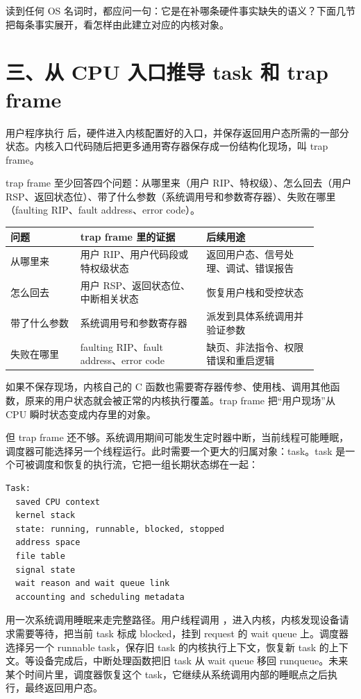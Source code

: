 读到任何 OS 名词时，都应问一句：它是在补哪条硬件事实缺失的语义？下面几节把每条事实展开，看怎样由此建立对应的内核对象。

\section{三、从 CPU 入口推导 task 和 trap frame}

用户程序执行  后，硬件进入内核配置好的入口，并保存返回用户态所需的一部分状态。内核入口代码随后把更多通用寄存器保存成一份结构化现场，叫 trap frame。

trap frame 至少回答四个问题：从哪里来（用户 RIP、特权级）、怎么回去（用户 RSP、返回状态位）、带了什么参数（系统调用号和参数寄存器）、失败在哪里（faulting RIP、fault address、error code）。

\begin{longtable}{p{0.2\linewidth}p{0.36\linewidth}p{0.32\linewidth}}
\toprule
问题 & trap frame 里的证据 & 后续用途 \\
\midrule
从哪里来 & 用户 RIP、用户代码段或特权级状态 & 返回用户态、信号处理、调试、错误报告 \\
怎么回去 & 用户 RSP、返回状态位、中断相关状态 & 恢复用户栈和受控状态 \\
带了什么参数 & 系统调用号和参数寄存器 & 派发到具体系统调用并验证参数 \\
失败在哪里 & faulting RIP、fault address、error code & 缺页、非法指令、权限错误和重启逻辑 \\
\bottomrule
\end{longtable}

如果不保存现场，内核自己的 C 函数也需要寄存器传参、使用栈、调用其他函数，原来的用户状态就会被正常的内核执行覆盖。trap frame 把“用户现场”从 CPU 瞬时状态变成内存里的对象。

但 trap frame 还不够。系统调用期间可能发生定时器中断，当前线程可能睡眠，调度器可能选择另一个线程运行。此时需要一个更大的归属对象：task。task 是一个可被调度和恢复的执行流，它把一组长期状态绑在一起：

\begin{lstlisting}
Task:
  saved CPU context
  kernel stack
  state: running, runnable, blocked, stopped
  address space
  file table
  signal state
  wait reason and wait queue link
  accounting and scheduling metadata
\end{lstlisting}

用一次系统调用睡眠来走完整路径。用户线程调用 ，进入内核，内核发现设备请求需要等待，把当前 task 标成 blocked，挂到 request 的 wait queue 上。调度器选择另一个 runnable task，保存旧 task 的内核执行上下文，恢复新 task 的上下文。等设备完成后，中断处理函数把旧 task 从 wait queue 移回 runqueue。未来某个时间片里，调度器恢复这个 task，它继续从系统调用内部的睡眠点之后执行，最终返回用户态。

